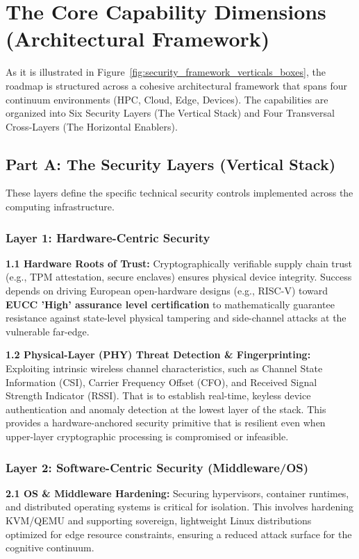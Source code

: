 \documentclass[12pt,a4paper]{report}
\begin{document}
\section{The Core Capability Dimensions (Architectural Framework)}
As it is illustrated in Figure~\ref{fig:security_framework_verticals_boxes}, the roadmap is structured across a cohesive architectural framework that spans four continuum environments (HPC, Cloud, Edge, Devices). The capabilities are organized into Six Security Layers (The Vertical Stack) and Four Transversal Cross-Layers (The Horizontal Enablers).

\subsection*{Part A: The Security Layers (Vertical Stack)}
These layers define the specific technical security controls implemented across the computing infrastructure.

\subsubsection*{Layer 1: Hardware-Centric Security}
\textbf{1.1 Hardware Roots of Trust:} Cryptographically verifiable supply chain trust (e.g., TPM attestation, secure enclaves) ensures physical device integrity. Success depends on driving European open-hardware designs (e.g., RISC-V) toward \textbf{EUCC 'High' assurance level certification} \cite{eucc} to mathematically guarantee resistance against state-level physical tampering and side-channel attacks at the vulnerable far-edge.

\textbf{1.2 Physical-Layer (PHY) Threat Detection \& Fingerprinting:} Exploiting intrinsic wireless channel characteristics, such as Channel State Information (CSI), Carrier Frequency Offset (CFO), and Received Signal Strength Indicator (RSSI). That is to establish real-time, keyless device authentication and anomaly detection at the lowest layer of the stack. This provides a hardware-anchored security primitive that is resilient even when upper-layer cryptographic processing is compromised or infeasible.

\subsubsection*{Layer 2: Software-Centric Security (Middleware/OS)}
\textbf{2.1 OS \& Middleware Hardening:} Securing hypervisors, container runtimes, and distributed operating systems is critical for isolation. This involves hardening KVM/QEMU and supporting sovereign, lightweight Linux distributions optimized for edge resource constraints, ensuring a reduced attack surface for the cognitive continuum.
\end{document}
